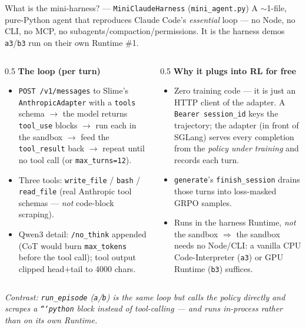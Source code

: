 \documentclass[aspectratio=169]{beamer}
\begin{document}
\begin{frame}{What is the mini-harness? --- \texttt{MiniClaudeHarness} (\texttt{mini\_agent.py})}
  \footnotesize A $\sim$1-file, pure-Python agent that reproduces Claude Code's \emph{essential} loop
  --- no Node, no CLI, no MCP, no subagents/compaction/permissions. It is the harness demos
  \texttt{a3}/\texttt{b3} run on their own Runtime \#1.
  \begin{columns}[T]
    \begin{column}{0.5\textwidth}
      \textbf{The loop (per turn)}
      \begin{itemize}\setlength\itemsep{0.12em}
        \item \texttt{POST /v1/messages} to Slime's \texttt{AnthropicAdapter} with a \texttt{tools}
          schema $\to$ the model returns \texttt{tool\_use} blocks $\to$ run each in the sandbox $\to$
          feed the \texttt{tool\_result} back $\to$ repeat until no tool call (or \texttt{max\_turns=12}).
        \item Three tools: \texttt{write\_file} / \texttt{bash} / \texttt{read\_file} (real Anthropic
          tool schemas --- \emph{not} code-block scraping).
        \item Qwen3 detail: \texttt{/no\_think} appended (CoT would burn \texttt{max\_tokens} before the
          tool call); tool output clipped head$+$tail to 4000 chars.
      \end{itemize}
    \end{column}
    \begin{column}{0.5\textwidth}
      \textbf{Why it plugs into RL for free}
      \begin{itemize}\setlength\itemsep{0.12em}
        \item Zero training code --- it is just an HTTP client of the adapter. A \texttt{Bearer
          session\_id} keys the trajectory; the adapter (in front of SGLang) serves every completion
          from the \emph{policy under training} and records each turn.
        \item \texttt{generate}'s \texttt{finish\_session} drains those turns into loss-masked GRPO samples.
        \item Runs in the harness Runtime, \emph{not} the sandbox $\Rightarrow$ the sandbox needs no
          Node/CLI: a vanilla CPU Code-Interpreter (\texttt{a3}) or GPU Runtime (\texttt{b3}) suffices.
      \end{itemize}
    \end{column}
  \end{columns}
  \vspace{0.2em}
  {\scriptsize\itshape Contrast: \texttt{run\_episode} (\texttt{a}/\texttt{b}) is the same loop but
  calls the policy directly and scrapes a \texttt{```python} block instead of tool-calling ---
  and runs in-process rather than on its own Runtime.}
\end{frame}
\end{document}
